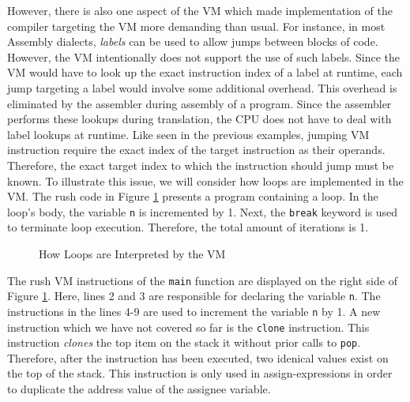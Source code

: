 However, there is also one aspect of the VM which made implementation of the compiler targeting the VM more demanding than usual.
For instance, in most Assembly dialects, \emph{labels} can be used to allow jumps between blocks of code.
However, the VM intentionally does not support the use of such labels.
Since the VM would have to look up the exact instruction index of a label at runtime,
each jump targeting a label would involve some additional overhead.
This overhead is eliminated by the assembler during assembly of a program.
Since the assembler performs these lookups during translation,
the CPU does not have to deal with label lookups at runtime.
Like seen in the previous examples, jumping VM instruction require the exact index of the target instruction as their operands.
Therefore, the exact target index to which the instruction should jump must be known.
To illustrate this issue, we will consider how loops are implemented in the VM.
The rush code in Figure \ref{fig:vm_loops} presents a program containing a loop.
In the loop's body, the variable \texttt{n} is incremented by 1.
Next, the \texttt{break} keyword is used to terminate loop execution.
Therefore, the total amount of iterations is 1.

\noindent
\begin{figure}[h]
	\begin{minipage}{.5\textwidth}
		\centering
	\end{minipage}%
	\begin{minipage}{.5\textwidth}
		\centering
	\end{minipage}
	\caption{How Loops are Interpreted by the VM}
	\label{fig:vm_loops}
\end{figure}

The rush VM instructions of the \texttt{main} function are displayed on the right side of Figure \ref{fig:vm_loops}.
Here, lines 2 and 3 are responsible for declaring the variable \texttt{n}.
The instructions in the lines 4-9 are used to increment the variable \texttt{n} by 1.
A new instruction which we have not covered so far is the \texttt{clone} instruction.
This instruction \emph{clones} the top item on the stack it without prior calls to \texttt{pop}.
Therefore, after the instruction has been executed, two idenical values exist on the top of the stack.
This instruction is only used in assign-expressions in order to duplicate the address value of the assignee variable.

